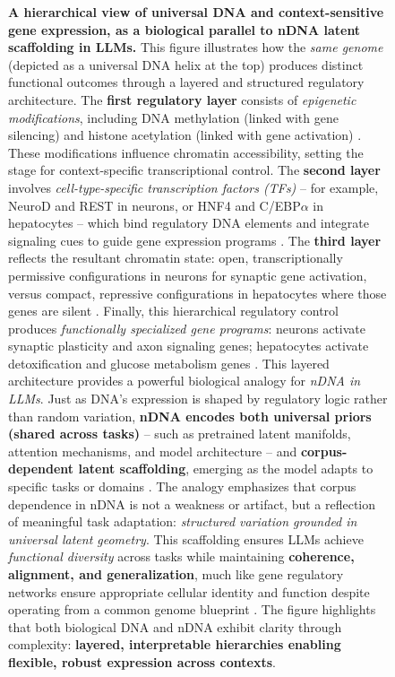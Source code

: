 \begin{figure}[ht!]
\caption{
\textbf{A hierarchical view of universal DNA and context-sensitive gene expression, as a biological parallel to nDNA latent scaffolding in LLMs.}
This figure illustrates how the \emph{same genome} (depicted as a universal DNA helix at the top) produces distinct functional outcomes through a layered and structured regulatory architecture. 
The \textbf{first regulatory layer} consists of \textit{epigenetic modifications}, including DNA methylation (linked with gene silencing) and histone acetylation (linked with gene activation) 
\citep{bird2007perceptions, clapier2017mechanisms}. 
These modifications influence chromatin accessibility, setting the stage for context-specific transcriptional control.  
The \textbf{second layer} involves \textit{cell-type-specific transcription factors (TFs)} -- for example, NeuroD and REST in neurons, or HNF4 and C/EBP$\alpha$ in hepatocytes -- which bind regulatory DNA elements 
and integrate signaling cues to guide gene expression programs \citep{lambert2018human, davidson2006gene}.  
The \textbf{third layer} reflects the resultant chromatin state: open, transcriptionally permissive configurations in neurons for synaptic gene activation, versus compact, repressive configurations in hepatocytes where those genes are silent 
\citep{thurman2012accessible, dekker2013exploring}.  
Finally, this hierarchical regulatory control produces \textit{functionally specialized gene programs}: neurons activate synaptic plasticity and axon signaling genes; hepatocytes activate detoxification and glucose metabolism genes 
\citep{lewin2013genes, alon2006introduction}.  
This layered architecture provides a powerful biological analogy for \emph{nDNA in LLMs}. 
Just as DNA’s expression is shaped by regulatory logic rather than random variation, \textbf{nDNA encodes both universal priors (shared across tasks)} -- such as pretrained latent manifolds, attention mechanisms, and model architecture -- 
and \textbf{corpus-dependent latent scaffolding}, emerging as the model adapts to specific tasks or domains \citep{olah2020zoom, geva2021transformer, beltagy2020longformer}. 
The analogy emphasizes that corpus dependence in nDNA is not a weakness or artifact, but a reflection of meaningful task adaptation: 
\emph{structured variation grounded in universal latent geometry}. 
This scaffolding ensures LLMs achieve \textit{functional diversity} across tasks while maintaining \textbf{coherence, alignment, and generalization}, much like gene regulatory networks ensure appropriate cellular identity 
and function despite operating from a common genome blueprint \citep{alon2006introduction, davidson2006gene}.  
The figure highlights that both biological DNA and nDNA exhibit clarity through complexity: 
\textbf{layered, interpretable hierarchies enabling flexible, robust expression across contexts}.
}
\label{fig:enhanced_dna_ndna}
\vspace{-3mm}
\end{figure}



